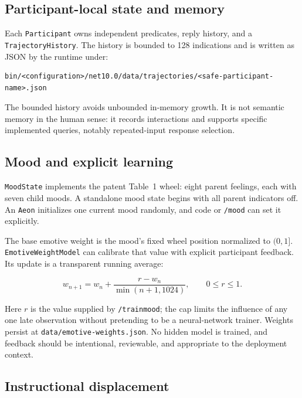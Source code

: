 \documentclass[11pt,a4paper]{article}
\begin{document}
\subsection{Participant-local state and memory}

Each \texttt{Participant} owns independent predicates, reply history, and a \texttt{TrajectoryHistory}. The history is bounded to 128 indications and is written as JSON by the runtime under:

\begin{minipage}{\linewidth}
\begin{lstlisting}
bin/<configuration>/net10.0/data/trajectories/<safe-participant-name>.json
\end{lstlisting}
\end{minipage}

The bounded history avoids unbounded in-memory growth. It is not semantic memory in the human sense: it records interactions and supports specific implemented queries, notably repeated-input response selection.

\subsection{Mood and explicit learning}

\texttt{MoodState} implements the patent Table~1 wheel: eight parent feelings, each with seven child moods. A standalone mood state begins with all parent indicators off. An \texttt{Aeon} initializes one current mood randomly, and code or \texttt{/mood} can set it explicitly.

The base emotive weight is the mood's fixed wheel position normalized to $(0,1]$. \texttt{EmotiveWeightModel} can calibrate that value with explicit participant feedback. Its update is a transparent running average:

\[
w_{n+1} = w_n + \frac{r - w_n}{\min(n+1,1024)}, \qquad 0 \leq r \leq 1.
\]

Here $r$ is the value supplied by \texttt{/trainmood}; the cap limits the influence of any one late observation without pretending to be a neural-network trainer. Weights persist at \texttt{data/emotive-weights.json}. No hidden model is trained, and feedback should be intentional, reviewable, and appropriate to the deployment context.

\subsection{Instructional displacement}
\end{document}
